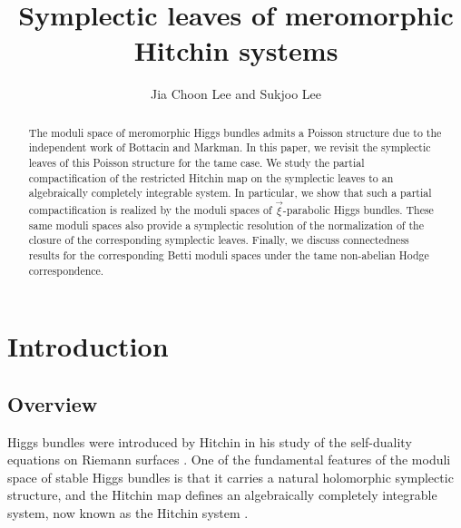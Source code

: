 \documentclass[11pt]{amsart}
\theoremstyle{plain}
\theoremstyle{definition}
\theoremstyle{remark}
\begin{document}
\title{Symplectic leaves of meromorphic Hitchin systems}


\author{Jia Choon Lee and Sukjoo Lee}
\address{Institute of Geometry and Physics, University of Science and Technology of China, 96 Jinzhai Road, Hefei 230026 P.R. China}

\address{Institute for Basic Science - Center for Geometry and Physics, 79 Jigok-ro 127 beon-gil, Nam-gu, Pohang, Gyeongbuk, KOREA 37673
}




\begin{abstract}
    The moduli space of meromorphic Higgs bundles admits a Poisson structure due to the independent work of Bottacin and Markman. In this paper, we revisit the symplectic leaves of this Poisson structure for the tame case. We study the partial compactification of the restricted Hitchin map on the symplectic leaves to an algebraically completely integrable system. In particular, we show that such a partial compactification is realized by the moduli spaces of $\vec{\xi}$-parabolic Higgs bundles. These same moduli spaces also provide a symplectic resolution of the normalization of the closure of the corresponding symplectic leaves. Finally, we discuss connectedness results for the corresponding Betti moduli spaces under the tame non-abelian Hodge correspondence. 
\end{abstract}



\baselineskip=14.5pt
\maketitle

\setcounter{tocdepth}{2} 

\tableofcontents

\section{Introduction}
\subsection{Overview}
Higgs bundles were introduced by Hitchin in his study of the self-duality equations on Riemann surfaces \cite{Hitchin1987SelfDuality}. One of the fundamental features of the moduli space of stable Higgs bundles is that it carries a natural holomorphic symplectic structure, and the Hitchin map defines an algebraically completely integrable system, now known as the Hitchin system \cite{Hitchin1987Stable,DonagiMarkman1996}.
\end{document}
